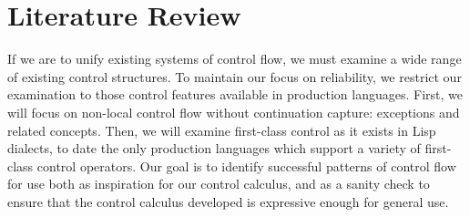 \documentclass[11pt]{article}
\newcommand{\maybePage}{\newpage}
\begin{document}
%
%
%
%
%
%
%

\maybePage
\part{Literature Review}

If we are to unify existing systems of control flow, we must examine a wide range of existing control structures. To maintain our focus on reliability, we restrict our examination to those control features available in production languages. First, we will focus on non-local control flow without continuation capture: exceptions and related concepts. Then, we will examine first-class control as it exists in Lisp dialects, to date the only production languages which support a variety of first-class control operators. Our goal is to identify successful patterns of control flow for use both as inspiration for our control calculus, and as a sanity check to ensure that the control calculus developed is expressive enough for general use.
\end{document}
